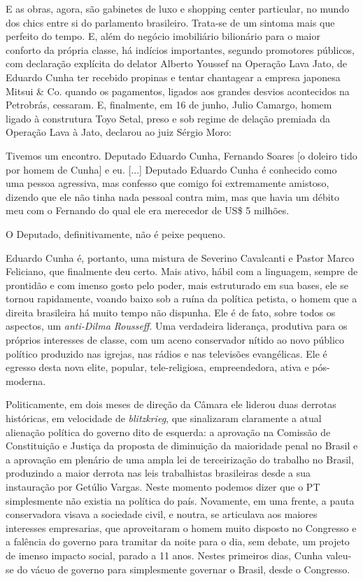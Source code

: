 E as obras, agora, são gabinetes de luxo e shopping center particular,
no mundo dos chics entre si do parlamento brasileiro. Trata-se de um
sintoma mais que perfeito do tempo. E, além do negócio imobiliário
bilionário para o maior conforto da própria classe, há indícios
importantes, segundo promotores públicos, com declaração explícita do
delator Alberto Youssef na Operação Lava Jato, de Eduardo Cunha ter
recebido propinas e tentar chantagear a empresa japonesa Mitsui \& Co.
quando os pagamentos, ligados aos grandes desvios acontecidos na
Petrobrás, cessaram. E, finalmente, em 16 de junho, Julio Camargo, homem
ligado à construtura Toyo Setal, preso e sob regime de delação premiada
da Operação Lava à Jato, declarou ao juiz Sérgio Moro:

Tivemos um encontro. Deputado Eduardo Cunha, Fernando Soares {[}o
doleiro tido por homem de Cunha{]} e eu. {[}...{]} Deputado Eduardo
Cunha é conhecido como uma pessoa agressiva, mas confesso que comigo foi
extremamente amistoso, dizendo que ele não tinha nada pessoal contra
mim, mas que havia um débito meu com o Fernando do qual ele era
merecedor de US\$ 5 milhões.~

O Deputado, definitivamente, não é peixe pequeno.

Eduardo Cunha é, portanto, uma mistura de Severino Cavalcanti e Pastor
Marco Feliciano, que finalmente deu certo. Mais ativo, hábil com a
linguagem, sempre de prontidão e com imenso gosto pelo poder, mais
estruturado em sua bases, ele se tornou rapidamente, voando baixo sob a
ruína da política petista, o homem que a direita brasileira há muito
tempo não dispunha. Ele é de fato, sobre todos os aspectos, um
\emph{anti-Dilma Rousseff}. Uma verdadeira liderança, produtiva para os
próprios interesses de classe, com um aceno conservador nítido ao novo
público político produzido nas igrejas, nas rádios e nas televisões
evangélicas. Ele é egresso desta nova elite, popular, tele-religiosa,
empreendedora, ativa e pós-moderna.

Politicamente, em dois meses de direção da Câmara ele liderou duas
derrotas históricas, em velocidade de \emph{blitzkrieg}, que sinalizaram
claramente a atual alienação política do governo dito de esquerda: a
aprovação na Comissão de Constituição e Justiça da proposta de
diminuição da maioridade penal no Brasil e a aprovação em plenário de
uma ampla lei de terceirização do trabalho no Brasil, produzindo a maior
derrota nas leis trabalhistas brasileiras desde a sua instauração por
Getúlio Vargas. Neste momento podemos dizer que o PT simplesmente não
existia na política do país. Novamente, em uma frente, a pauta
conservadora visava a sociedade civil, e noutra, se articulava aos
maiores interesses empresarias, que aproveitaram o homem muito disposto
no Congresso e a falência do governo para tramitar da noite para o dia,
sem debate, um projeto de imenso impacto social, parado a 11 anos.
Nestes primeiros dias, Cunha valeu-se do vácuo de governo para
simplesmente governar o Brasil, desde o Congresso.

